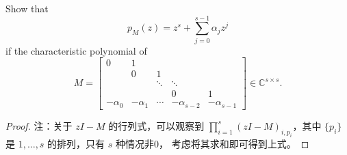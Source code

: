 \documentclass[lang=cn,a4paper,newtx,bibend=bibtex]{elegantpaper}
\begin{document}
\begin{prob}[Exercise 10.112]
  Show that 
  \[
    p_M(z) = z^s + \sum_{j = 0}^{s - 1} \alpha_j z^j
  \]
  if the characteristic polynomial of 
  \[
    M = \begin{bmatrix}
      0 & 1 & & & \\
      & 0 & 1 & & \\
      & & \ddots & \ddots & \\
      & & & 0 & 1 \\
      -\alpha_0 & -\alpha_1 & \cdots & -\alpha_{s-2} & -\alpha_{s-1}
    \end{bmatrix}
    \in \mathbb{C}^{s\times s}.
  \]
\end{prob}

\begin{proof}
  注：关于 $zI - M$ 的行列式，可以观察到 $\prod_{i = 1}^s (zI - M)_{i, p_i}$，其中 $\{p_i\}$ 是 $1, \dots, s$ 的排列，只有 $s$ 种情况非0，
  考虑将其求和即可得到上式。
\end{proof}

\nocite{*}
\printbibliography[heading=bibintoc, title=\ebibname]
\end{document}
